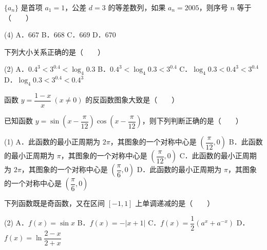 

\begin{question}
$\{a_n\}$ 是首项 $a_1 = 1$，公差 $d = 3$ 的等差数列，如果 $a_n = 2005$，则序号 $n$ 等于\mbox{（　　）}

\begin{gkopts}(4)
\task A．$667$
\task B．$668$
\task C．$669$
\task D．$670$
\end{gkopts}

\end{question}
\begin{question}
下列大小关系正确的是\mbox{（　　）}

\begin{gkopts}(2)
\task A．$0.4^3 < 3^{0.4} < \log_4 0.3$
\task B．$0.4^3 < \log_4 0.3 < 3^{0.4}$
\task C．$\log_4 0.3 < 0.4^3 < 3^{0.4}$
\task D．$\log_4 0.3 < 3^{0.4} < 0.4^3$
\end{gkopts}

\Needspace{0.4\textheight}
\end{question}
\begin{question}
函数 $y = \dfrac{1-x}{x}\ (x \neq 0)$ 的反函数图象大致是\mbox{（　　）}
\nopagebreak[4]
\begin{center}\end{center}
\nopagebreak[4]
\end{question}
\begin{question}
已知函数 $y = \sin\left(x - \dfrac{\pi}{12}\right)\cos\left(x - \dfrac{\pi}{12}\right)$，则下列判断正确的是\mbox{（　　）}

\begin{gkopts}(1)
\task A．此函数的最小正周期为 $2\pi$，其图象的一个对称中心是 $\left(\dfrac{\pi}{12}, 0\right)$
\task B．此函数的最小正周期为 $\pi$，其图象的一个对称中心是 $\left(\dfrac{\pi}{12}, 0\right)$
\task C．此函数的最小正周期为 $2\pi$，其图象的一个对称中心是 $\left(\dfrac{\pi}{6}, 0\right)$
\task D．此函数的最小正周期为 $\pi$，其图象的一个对称中心是 $\left(\dfrac{\pi}{6}, 0\right)$
\end{gkopts}

\end{question}
\begin{question}
下列函数既是奇函数，又在区间 $[-1, 1]$ 上单调递减的是\mbox{（　　）}

\begin{gkopts}(2)
\task A．$f(x) = \sin x$
\task B．$f(x) = -|x + 1|$
\task C．$f(x) = \dfrac{1}{2}(a^x + a^{-x})$
\task D．$f(x) = \ln \dfrac{2-x}{2+x}$
\end{gkopts}

\end{question}
